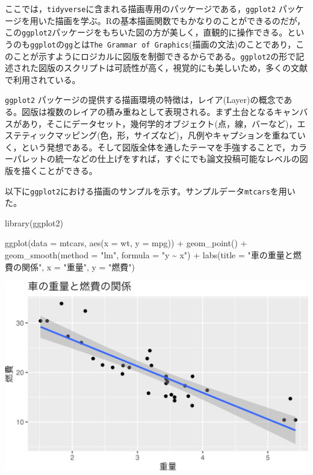 \documentclass[
  a4paper,
]{ltjsbook}
\newenvironment{Shaded}{\begin{snugshade}}{\end{snugshade}}
\newcommand{\AttributeTok}[1]{\textcolor[rgb]{0.40,0.45,0.13}{#1}}
\newcommand{\FunctionTok}[1]{\textcolor[rgb]{0.28,0.35,0.67}{#1}}
\newcommand{\NormalTok}[1]{\textcolor[rgb]{0.00,0.23,0.31}{#1}}
\newcommand{\SpecialCharTok}[1]{\textcolor[rgb]{0.37,0.37,0.37}{#1}}
\newcommand{\StringTok}[1]{\textcolor[rgb]{0.13,0.47,0.30}{#1}}
\begin{document}
ここでは，\texttt{tidyverse}に含まれる描画専用のパッケージである，\texttt{ggplot2}
パッケージを用いた描画を学ぶ。Rの基本描画関数でもかなりのことができるのだが，この\texttt{ggplot2}パッケージをもちいた図の方が美しく，直観的に操作できる。というのも\texttt{ggplot}の\texttt{gg}とは\texttt{The\ Grammar\ of\ Graphics}(描画の文法)のことであり，このことが示すようにロジカルに図版を制御できるからである。\texttt{ggplot2}の形で記述された図版のスクリプトは可読性が高く，視覚的にも美しいため，多くの文献で利用されている。

\texttt{ggplot2}
パッケージの提供する描画環境の特徴は，レイア(Layer)の概念である。図版は複数のレイアの積み重ねとして表現される。まず土台となるキャンバスがあり，そこにデータセット，幾何学的オブジェクト(点，線，バーなど)，エステティックマッピング(色，形，サイズなど)，凡例やキャプションを重ねていく，という発想である。そして図版全体を通したテーマを手強することで，カラーパレットの統一などの仕上げをすれば，すぐにでも論文投稿可能なレベルの図版を描くことができる。

以下に\texttt{ggplot2}における描画のサンプルを示す。サンプルデータ\texttt{mtcars}を用いた。

\begin{Shaded}
\begin{Highlighting}[]
\FunctionTok{library}\NormalTok{(ggplot2)}

\FunctionTok{ggplot}\NormalTok{(}\AttributeTok{data =}\NormalTok{ mtcars, }\FunctionTok{aes}\NormalTok{(}\AttributeTok{x =}\NormalTok{ wt, }\AttributeTok{y =}\NormalTok{ mpg)) }\SpecialCharTok{+}
  \FunctionTok{geom\_point}\NormalTok{() }\SpecialCharTok{+}
  \FunctionTok{geom\_smooth}\NormalTok{(}\AttributeTok{method =} \StringTok{"lm"}\NormalTok{, }\AttributeTok{formula =} \StringTok{"y \textasciitilde{} x"}\NormalTok{) }\SpecialCharTok{+}
  \FunctionTok{labs}\NormalTok{(}\AttributeTok{title =} \StringTok{"車の重量と燃費の関係"}\NormalTok{, }\AttributeTok{x =} \StringTok{"重量"}\NormalTok{, }\AttributeTok{y =} \StringTok{"燃費"}\NormalTok{)}
\end{Highlighting}
\end{Shaded}

\includegraphics{chapter04_files/figure-pdf/ggplotSample1-1.png}
\end{document}
